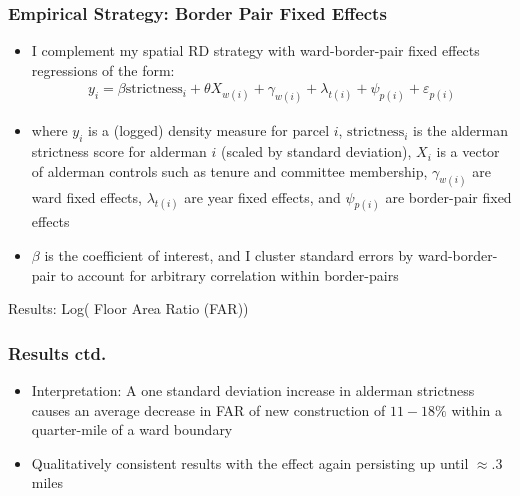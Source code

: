 \begin{frame}
    \frametitle{Empirical Strategy: Border Pair Fixed Effects} 
            \begin{itemize} 
                \item I complement my spatial RD strategy with ward-border-pair fixed effects regressions  {\scriptsize{\citep{black_better_1999}}} of the form:
                \[
                \begin{aligned}
                    y_i =\beta \text{strictness}_i + \theta X_{w(i)} + \gamma_{w(i)} + \lambda_{t(i)} + \psi_{p(i)} + \varepsilon_{p(i)}
                \end{aligned}
                \]
                \item where $y_i$ is a (logged) density measure for parcel $i$, $\text{strictness}_i$ is the alderman strictness score for alderman $i$ (scaled by standard deviation), $X_i$ is a vector of alderman controls such as tenure and committee membership, $\gamma_{w(i)}$ are ward fixed effects, $\lambda_{t(i)}$ are year fixed effects, and $\psi_{p(i)}$ are border-pair fixed effects
                \item $\beta$ is the coefficient of interest, and I cluster standard errors by ward-border-pair to account for arbitrary correlation within border-pairs
            \end{itemize}
\end{frame}


\begin{frame}[t,label=main_FAR_table]{Results: Log( Floor Area Ratio (FAR))}
    \centering
    \scriptsize{}
    \vfill\hfill
    \hyperlink{levels_table}{}
    \hspace{0.2em}\hyperlink{lapu_table}{}
    \hspace{0.2em}\hyperlink{bcr_table}{}
    \hspace{0.2em}\hyperlink{lps_table}{}
\end{frame}


\begin{frame}
    \frametitle{Results ctd.} 
        \begin{itemize}
            \item Interpretation: A one standard deviation increase in alderman strictness causes an average decrease in FAR of new construction of $11-18\%$ within a quarter-mile of a ward boundary
            \item Qualitatively consistent results with the effect again persisting up until $\approx .3$ miles
        \end{itemize}
 \end{frame} 


